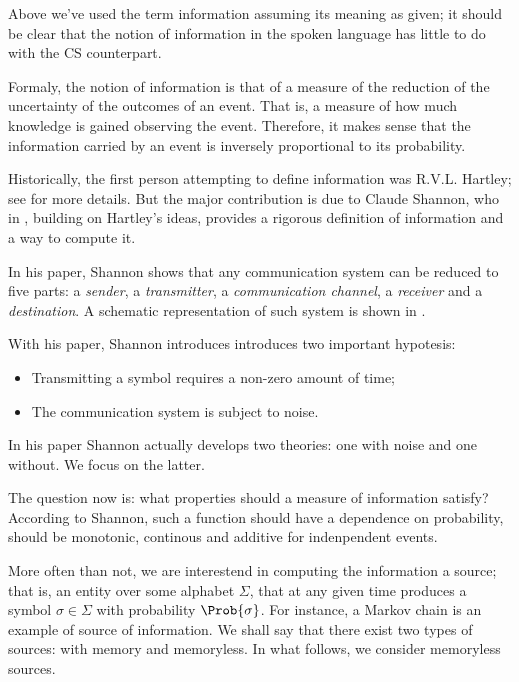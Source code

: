 \documentclass{subfiles}
\begin{document}
    Above we've used the term information assuming its meaning as given; 
        it should be clear that the notion of information in the spoken language
        has little to do with the CS counterpart. 

    Formaly, the notion of information is that of a measure of the
        reduction of the uncertainty of the outcomes of an event. 
        That is, a measure of how much knowledge is gained observing the event. 
        Therefore, it makes sense that the information carried by an event is
        inversely proportional to its probability.

    Historically, the first person attempting to define information was R.V.L. Hartley;
        see \cite{hartley1928} for more details. But the major contribution is due to 
        Claude Shannon, who in \cite{shannon1948}, building on Hartley's ideas,
        provides a rigorous definition of information and a way to compute it.

    In his paper, Shannon shows that any communication system can be reduced to 
        five parts: a \emph{sender}, a \emph{transmitter}, a \emph{communication channel}, a \emph{receiver} and a \emph{destination}. 
        A schematic representation of such system is shown in .

    With his paper, Shannon introduces introduces two important hypotesis:
        \begin{itemize}
            \item Transmitting a symbol requires a non-zero amount of time;
            \item The communication system is subject to noise.
        \end{itemize}

        

    \begin{remark*}
        In his paper Shannon actually develops two theories: 
            one with noise and one without. We focus on the latter.
    \end{remark*}

    The question now is: what properties should a measure of information satisfy?
        According to Shannon, such a function should have a dependence on probability,
        should be monotonic, continous and additive for indenpendent events.

    More often than not, we are interestend in computing the information a source;
        that is, an entity over some alphabet \(\Sigma\),
        that at any given time produces a symbol \(\sigma \in \Sigma\)
        with probability \(\Prob{\sigma}\). 
        For instance, a Markov chain is an example of source of information.
        We shall say that there exist two types of sources: with memory and memoryless.
        In what follows, we consider memoryless sources.
\end{document}

